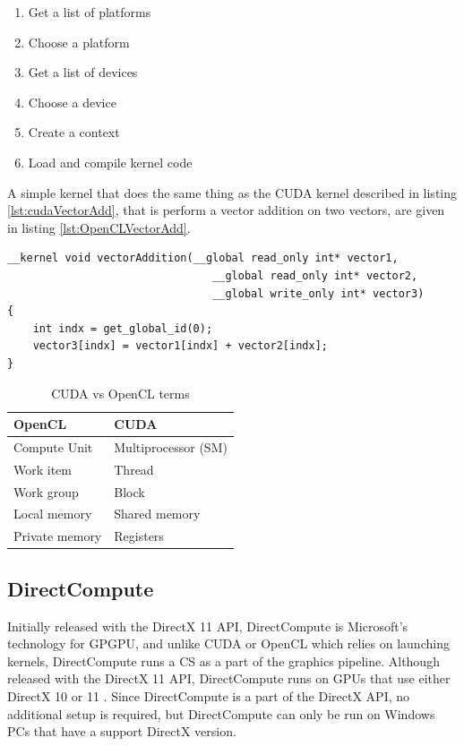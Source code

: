 \begin{enumerate}
    \item Get a list of platforms
    \item Choose a platform
    \item Get a list of devices
    \item Choose a device
    \item Create a context
    \item Load and compile kernel code    
\end{enumerate}

A simple kernel that does the same thing as the CUDA kernel described in listing \ref{lst:cudaVectorAdd}, that is perform a vector addition on two vectors, are given in listing \ref{lst:OpenCLVectorAdd}.

\begin{lstlisting}[caption={OpenCL vector addition kernel}, label={lst:OpenCLVectorAdd}, frame=single] 
__kernel void vectorAddition(__global read_only int* vector1, 
                                __global read_only int* vector2, 
                                __global write_only int* vector3)
{
	int indx = get_global_id(0);
	vector3[indx] = vector1[indx] + vector2[indx];
}
\end{lstlisting}

\begin{table}[!h]
    \begin{tabularx}{\textwidth}{ |X|X| }
      \hline
      \rowcolor{gray}
      \textbf{OpenCL}   &  \textbf{CUDA} \\ \hline 
        Compute Unit    & Multiprocessor (SM) \\ \hline
        Work item       & Thread \\ \hline
        Work group      & Block \\ \hline
        Local memory    & Shared memory \\ \hline
        Private memory  & Registers \\ \hline
    \end{tabularx}
\caption{\label{tab:OpenCLvsCUDA} CUDA vs OpenCL terms}
\end{table}




\subsection{DirectCompute}
Initially released with the DirectX 11 API, DirectCompute is Microsoft's technology for GPGPU, and unlike CUDA or OpenCL which relies on launching kernels, DirectCompute runs a CS as a part of the graphics pipeline. Although released with the DirectX 11 API, DirectCompute runs on GPUs that use either DirectX 10 or 11 \cite{NVidiaDirectCompute}. Since DirectCompute is a part of the DirectX API, no additional setup is required, but DirectCompute can only be run on Windows PCs that have a support DirectX version.

